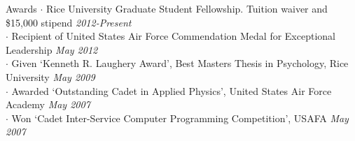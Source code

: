 
\begin{rSection}{Awards}
  $\cdot$ Rice University Graduate Student Fellowship. Tuition waiver and \$15,000 stipend
  \hfill {\em 2012-Present} \\
  $\cdot$ Recipient of United States Air Force Commendation Medal for Exceptional Leadership 
  \hfill {\em May 2012} \\
  $\cdot$ Given `Kenneth R. Laughery Award', Best Masters Thesis in Psychology, Rice University
  \hfill {\em May 2009} \\
  $\cdot$ Awarded `Outstanding Cadet in Applied Physics', United States Air Force Academy
  \hfill {\em May 2007} \\
  $\cdot$ Won `Cadet Inter-Service Computer Programming Competition', USAFA
  \hfill {\em May 2007}
\end{rSection}

